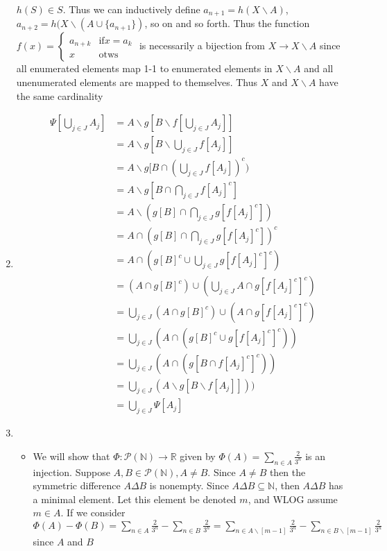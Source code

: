 \documentclass[12pt, letterpaper]{article}
\newcommand{\N}{\mathbb{N}}
\newcommand{\R}{\mathbb{R}}
\newcommand{\Po}{\mathcal{P}}
\begin{document}
\begin{enumerate}
	$h(S) \in S$.  Thus we can inductively define $a_{n+1} = h(X \backslash A)$,
	$a_{n+2} = h(X \backslash (A \cup \{a_{n+1}\})$, so on and so forth.  
	Thus the function $f(x) =  \begin{cases} a_{n+k} &\text{if}
	x = a_k \\ x & \text{otws} \end{cases}$ is necessarily a bijection from 
	$X \to X\backslash A$ since all enumerated elements map 1-1 to enumerated 
	elements in $X \backslash A$ and all unenumerated elements are mapped to 
	themselves.  Thus $X$ and $X \backslash A$ have the same cardinality  
	\item 
	\begin{align*}
		\Psi[\bigcup_{j \in J} A_j] &= A \backslash g [B \backslash f[\bigcup_{j \in J} A_j]]\\
		&= A \backslash g [B \backslash \bigcup_{j \in J} f[ A_j]]\\
		&= A \backslash g [B \cap (\bigcup_{j \in J} f[ A_j])^c)\\
		&= A \backslash g [B \cap \bigcap_{j \in J} f[A_j]^c]\\
		&= A \backslash (g[B] \cap \bigcap_{j \in J} g[f[A_j]^c])\\
		&= A \cap (g[B] \cap \bigcap_{j \in J} g[f[A_j]^c])^c\\
		&= A \cap (g[B]^c \cup \bigcup_{j \in J} g[f[A_j]^c]^c)\\
		&= (A \cap g[B]^c) \cup (\bigcup_{j \in J} A \cap g[f[A_j]^c]^c)\\
		&= \bigcup_{j \in J} (A \cap g[B]^c) \cup (A \cap g[f[A_j]^c]^c)\\
		&= \bigcup_{j \in J} (A \cap (g[B]^c \cup g[f[A_j]^c]^c))\\
		&= \bigcup_{j \in J} (A \cap (g[B \cap f[A_j]^c]^c))\\
		&= \bigcup_{j \in J} (A \backslash g[B \backslash f[A_j]]))\\
		&= \bigcup_{j \in J} \Psi[A_j]
	\end{align*}
	\item 
	\begin{itemize}
		\item We will show that $\Phi: \Po(\N) \to \R$ given by $\Phi(A) = \sum_{n \in A} \frac{2}{3^n}$ is an injection.
		Suppose $A,B \in \Po(\N), A\neq B$.  Since $A \neq B$ then the symmetric difference $A \Delta B$ is nonempty.  
		Since $A \Delta B \subseteq \N$, then $A \Delta B$ has a minimal element.  Let this element be denoted $m$, and 
		WLOG assume $m \in A$.  If we consider $\Phi(A) - \Phi(B) = \sum_{n \in A} \frac{2}{3^n}-\sum_{n \in B} \frac{2}{3^n} = \sum_{n \in A\backslash [m-1]} \frac{2}{3^n} - \sum_{n \in B\backslash [m-1]} \frac{2}{3^n}$ since $A$ and $B$

\end{itemize}
\end{enumerate}
\end{document}
